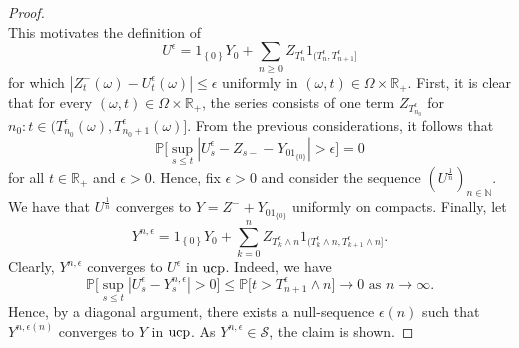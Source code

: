 \documentclass[11pt,a4paper,twoside,openany]{report}
\numberwithin{equation}{section}
\theoremstyle{plain} %
\theoremstyle{definition} %
\theoremstyle{remark} %
\begin{document}
\begin{proof}
\begin{equation*}
 \end{equation*}
 This motivates the definition of 
 \begin{equation*}
        U^{\epsilon}=1_{\left\{0\right\}}Y_0+\sum_{n\geq 0} Z_{T_n^{\epsilon}}1_{(T_{n}^{\epsilon},T_{n+1}^{\epsilon}]} 
    \end{equation*}
for which \(|Z_t^{-}(\omega)-U^{\epsilon}_t(\omega)|\leq\epsilon\)
uniformly in \((\omega,t)\in\Omega\times\mathbb{R}_+\).
First, it is clear that for every \((\omega,t)\in\Omega\times\mathbb{R}_+\), the series consists of one term \(Z_{T_{n_0}^\epsilon}\) for \(n_0:t\in(T_{n_0}^\epsilon(\omega),T_{n_0+1}^\epsilon(\omega)]\).
From the previous considerations, it follows that
\begin{equation*}
    \mathbb{P}\Big[\sup_{s\leq t}|U^{\epsilon}_s-Z_{s-}-Y_01_{\{0\}}|>\epsilon\Big]=0
\end{equation*}
for all \(t\in\mathbb{R}_+\) and \(\epsilon>0\). Hence, fix \(\epsilon>0\) and consider the sequence \((U^{\frac{1}{n}})_{n\in\mathbb{N}}\). We have that \(U^{\frac{1}{n}}\) converges to \(Y=Z^-+Y_01_{\{0\}}\) uniformly on compacts. Finally, let 
 \begin{equation*}
        Y^{n,\epsilon}=1_{\left\{0\right\}}Y_0+\sum_{k=0 }^nZ_{T_k^{\epsilon}\wedge n}1_{\big(T_{k}^{\epsilon}\wedge n,T_{k+1}^{\epsilon}\wedge n\big]}.
    \end{equation*}
Clearly, \(Y^{n,\epsilon}\) converges to \(U^{\epsilon}\) in \(\rm{ucp}\). Indeed, we have
\begin{equation*}
    \mathbb{P}\Big[\sup_{s\leq t}|U_s^{\epsilon}-Y_s^{n,\epsilon}|>0\Big]\leq \mathbb{P}\big[t>T_{n+1}^\epsilon\wedge n\big]\to 0 \text{ as }n\to\infty.
\end{equation*}
Hence, by a diagonal argument, there exists a null-sequence \(\epsilon(n)\) such that \(Y^{n,\epsilon(n)}\) converges to \(Y\) in \(\rm{ucp}\).
As \(Y^{n,\epsilon}\in\mathcal{S}\), the claim is shown.
\end{proof}
\end{document}

